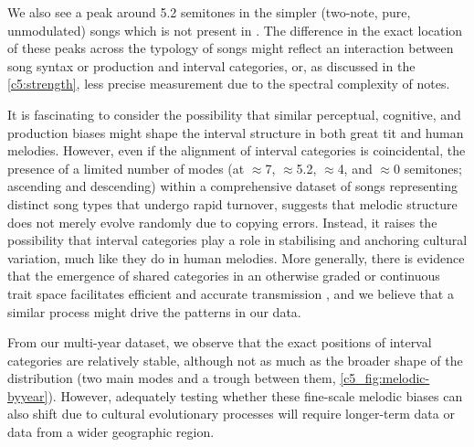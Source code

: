 We also see a peak around 5.2 semitones in the simpler (two-note, pure, unmodulated) songs  which is not present in . The difference in the exact location of these peaks across the typology of songs might reflect an interaction between song syntax or production and interval categories, or, as discussed in the \autoref{c5:strength}, less precise measurement due to the spectral complexity of notes.

It is fascinating to consider the possibility that similar perceptual, cognitive, and production biases might shape the interval structure in both great tit and human melodies. However, even if the alignment of interval categories is coincidental, the presence of a limited number of modes (at $\approx$7, $\approx$5.2, $\approx$4, and $\approx$0 semitones; ascending and descending) within a comprehensive dataset of songs representing distinct song types that undergo rapid turnover, suggests that melodic structure does not merely evolve randomly due to copying errors. Instead, it raises the possibility that interval categories play a role in stabilising and anchoring cultural variation, much like they do in human melodies. More generally, there is evidence that the emergence of shared categories in an otherwise graded or continuous trait space facilitates efficient and accurate transmission  \autocite{falandays2022, tchernichovski2017, silvey2019, decastro-arrazola2019, kirby2017}, and we believe that a similar process might drive the patterns in our data.

From our multi-year dataset, we observe that the exact positions of interval categories are relatively stable, although not as much as the broader shape of the distribution (two main modes and a trough between them, \autoref{c5_fig:melodic-byyear}). However, adequately testing whether these fine-scale melodic biases can also shift due to cultural evolutionary processes will require longer-term data or data from a wider geographic region.


